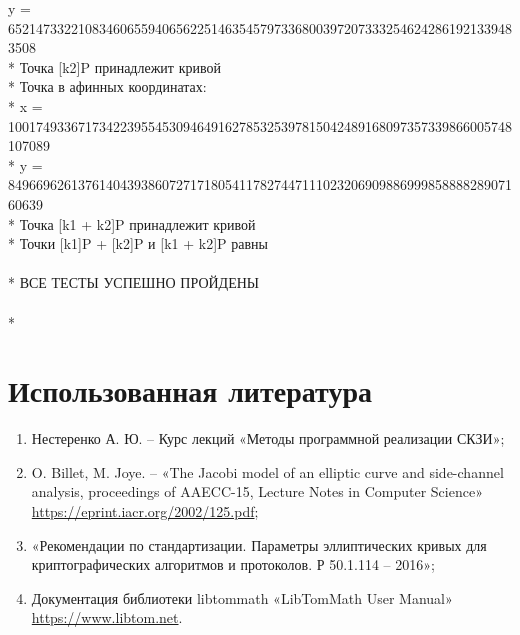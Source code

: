 \documentclass[12pt]{article}
\begin{document}
y = 6521473322108346065594065622514635457973368003972073332546242861921339483508\\*
Точка [k2]P принадлежит кривой\\*
Точка в афинных координатах:\\*
x = 100174933671734223955453094649162785325397815042489168097357339866005748107089\\*
y = 84966962613761404393860727171805411782744711102320690988699985888828907160639\\*
Точка [k1 + k2]P принадлежит кривой\\*
Точки [k1]P + [k2]P и [k1 + k2]P равны\\
\\*
ВСЕ ТЕСТЫ УСПЕШНО ПРОЙДЕНЫ\\
\\*



\section{Использованная литература}
\begin{enumerate}
\item Нестеренко А. Ю. – Курс лекций «Методы программной реализации
СКЗИ»;
\item O. Billet, M. Joye. – «The Jacobi model of an elliptic curve and side-channel
analysis, proceedings of AAECC-15, Lecture Notes in Computer Science» \url{https://eprint.iacr.org/2002/125.pdf};
\item «Рекомендации по стандартизации. Параметры эллиптических кривых
для криптографических алгоритмов и протоколов. Р 50.1.114 – 2016»;
\item Документация библиотеки libtommath «LibTomMath User Manual» \url{https://www.libtom.net}.
\end{enumerate}
\end{document}
